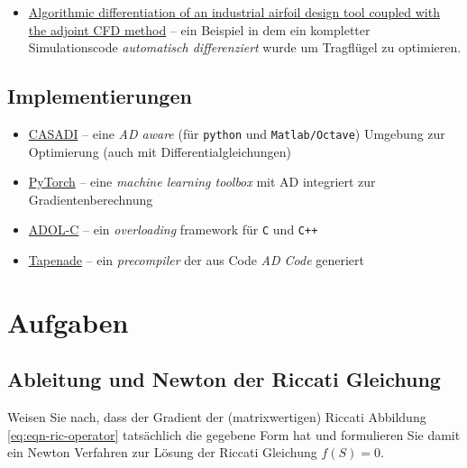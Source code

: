 \documentclass[
]{book}
\providecommand{\tightlist}{%
  \setlength{\itemsep}{0pt}\setlength{\parskip}{0pt}}
\theoremstyle{definition}
\theoremstyle{definition}
\theoremstyle{definition}
\theoremstyle{definition}
\theoremstyle{remark}
\begin{document}
\begin{itemize}
\tightlist
\item
  \href{https://doi.org/10.1007/s11081-019-09474-x}{Algorithmic differentiation of an industrial airfoil design tool coupled with the adjoint CFD method} -- ein Beispiel in dem ein kompletter Simulationscode \emph{automatisch differenziert} wurde um Tragflügel zu optimieren.
\end{itemize}

\hypertarget{implementierungen}{%
\subsection{Implementierungen}\label{implementierungen}}

\begin{itemize}
\tightlist
\item
  \href{https://web.casadi.org/}{CASADI} -- eine \emph{AD aware} (für \texttt{python} und \texttt{Matlab/Octave}) Umgebung zur Optimierung (auch mit
  Differentialgleichungen)
\item
  \href{https://pytorch.org/}{PyTorch} -- eine \emph{machine learning toolbox} mit AD integriert zur
  Gradientenberechnung
\item
  \href{https://www3.math.tu-berlin.de/Vorlesungen/SS06/AlgoDiff/adolc-110.pdf}{ADOL-C} -- ein \emph{overloading} framework für \texttt{C} und \texttt{C++}
\item
  \href{https://tapenade.gitlabpages.inria.fr/userdoc/build/html/tapenade/whatisad.html}{Tapenade} -- ein \emph{precompiler} der aus Code \emph{AD Code} generiert
\end{itemize}

\hypertarget{aufgaben-3}{%
\section{Aufgaben}\label{aufgaben-3}}

\hypertarget{ableitung-und-newton-der-riccati-gleichung}{%
\subsection{Ableitung und Newton der Riccati Gleichung}\label{ableitung-und-newton-der-riccati-gleichung}}

Weisen Sie nach, dass der Gradient der (matrixwertigen) Riccati Abbildung
\eqref{eq:eqn-ric-operator}
tatsächlich die gegebene Form hat und formulieren Sie damit ein Newton
Verfahren zur Lösung der Riccati Gleichung \(f(S)=0\).
\end{document}
